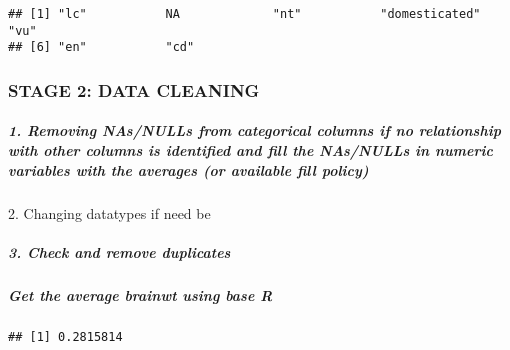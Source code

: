 \documentclass[
]{article}
\newenvironment{Shaded}{\begin{snugshade}}{\end{snugshade}}
\newcommand{\AttributeTok}[1]{\textcolor[rgb]{0.77,0.63,0.00}{#1}}
\newcommand{\ConstantTok}[1]{\textcolor[rgb]{0.00,0.00,0.00}{#1}}
\newcommand{\FunctionTok}[1]{\textcolor[rgb]{0.00,0.00,0.00}{#1}}
\newcommand{\NormalTok}[1]{#1}
\newcommand{\OtherTok}[1]{\textcolor[rgb]{0.56,0.35,0.01}{#1}}
\newcommand{\SpecialCharTok}[1]{\textcolor[rgb]{0.00,0.00,0.00}{#1}}
\begin{document}
\begin{Shaded}
\end{Shaded}

\begin{verbatim}
## [1] "lc"           NA             "nt"           "domesticated" "vu"          
## [6] "en"           "cd"
\end{verbatim}

\hypertarget{stage-2-data-cleaning}{%
\subsubsection{STAGE 2: DATA CLEANING}\label{stage-2-data-cleaning}}

\hypertarget{removing-nasnulls-from-categorical-columns-if-no-relationship-with-other-columns-is-identified-and-fill-the-nasnulls-in-numeric-variables-with-the-averages-or-available-fill-policy}{%
\subparagraph{1. Removing NAs/NULLs from categorical columns if no
relationship with other columns is identified and fill the NAs/NULLs in
numeric variables with the averages (or available fill
policy)}\label{removing-nasnulls-from-categorical-columns-if-no-relationship-with-other-columns-is-identified-and-fill-the-nasnulls-in-numeric-variables-with-the-averages-or-available-fill-policy}}

2. Changing datatypes if need be

\hypertarget{check-and-remove-duplicates}{%
\subparagraph{3. Check and remove
duplicates}\label{check-and-remove-duplicates}}

\hypertarget{get-the-average-brainwt-using-base-r}{%
\subparagraph{Get the average brainwt using base
R}\label{get-the-average-brainwt-using-base-r}}

\begin{Shaded}
\end{Shaded}

\begin{verbatim}
## [1] 0.2815814
\end{verbatim}
\end{document}
